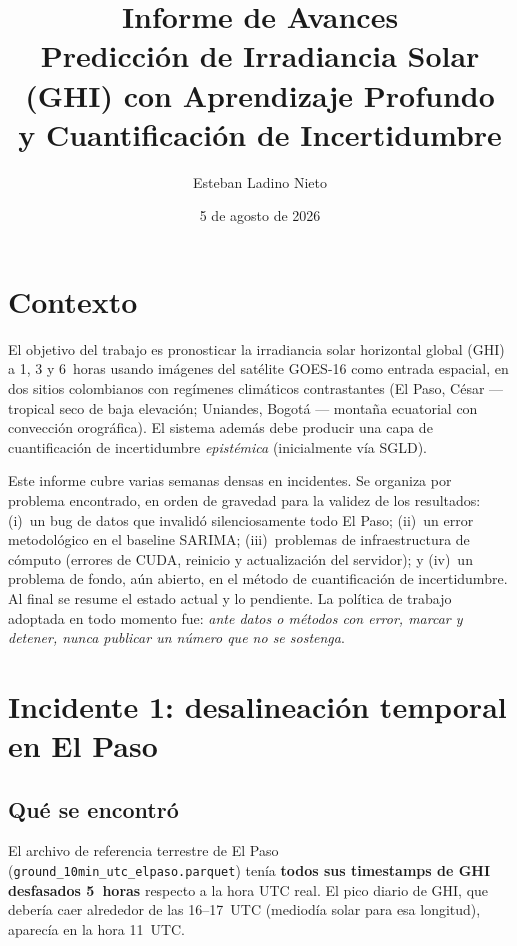 \documentclass[12pt,a4paper]{article}
\title{\textbf{Informe de Avances}\\[0.4em]
       \large Predicción de Irradiancia Solar (GHI) con Aprendizaje Profundo\\
       y Cuantificación de Incertidumbre}
\author{Esteban Ladino Nieto}
\date{5 de agosto de 2026}
\begin{document}
\maketitle

\section{Contexto}

El objetivo del trabajo es pronosticar la irradiancia solar horizontal
global (GHI) a 1, 3 y 6~horas usando imágenes del satélite GOES-16 como
entrada espacial, en dos sitios colombianos con regímenes climáticos
contrastantes (El Paso, César --- tropical seco de baja elevación; Uniandes,
Bogotá --- montaña ecuatorial con convección orográfica). El sistema además
debe producir una capa de cuantificación de incertidumbre \emph{epistémica}
(inicialmente vía SGLD).

Este informe cubre varias semanas densas en incidentes. Se organiza por
problema encontrado, en orden de gravedad para la validez de los resultados:
(i)~un bug de datos que invalidó silenciosamente todo El Paso;
(ii)~un error metodológico en el baseline SARIMA; (iii)~problemas de
infraestructura de cómputo (errores de CUDA, reinicio y actualización del
servidor); y (iv)~un problema de fondo, aún abierto, en el método de
cuantificación de incertidumbre. Al final se resume el estado actual y lo
pendiente. La política de trabajo adoptada en todo momento fue: \emph{ante
datos o métodos con error, marcar y detener, nunca publicar un número que no
se sostenga}.

\section{Incidente 1: desalineación temporal en El Paso}
\label{sec:incidente}

\subsection{Qué se encontró}

El archivo de referencia terrestre de El Paso
(\texttt{ground\_10min\_utc\_elpaso.parquet}) tenía \textbf{todos sus
timestamps de GHI desfasados 5~horas} respecto a la hora UTC real. El pico
diario de GHI, que debería caer alrededor de las 16--17~UTC (mediodía solar
para esa longitud), aparecía en la hora 11~UTC.
\end{document}
